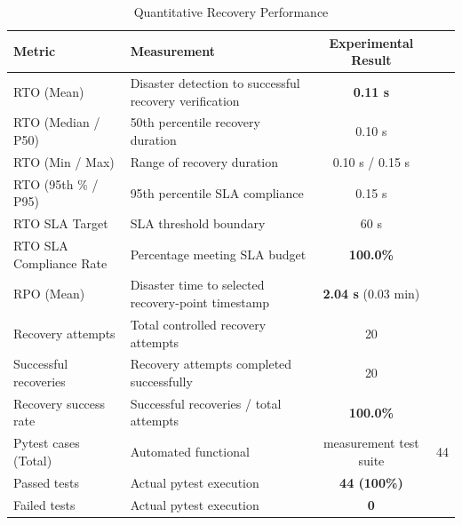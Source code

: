 \begin{table}[htbp]
\caption{Quantitative Recovery Performance}
\label{tab:quant_recovery}
\centering
\begin{tabular}{|l|p{4.2cm}|c|}
\hline
\textbf{Metric} & \textbf{Measurement} & \textbf{Experimental Result} \\
\hline
RTO (Mean) & Disaster detection to successful recovery verification & \textbf{0.11 s} \\
RTO (Median / P50) & 50th percentile recovery duration & 0.10 s \\
RTO (Min / Max) & Range of recovery duration & 0.10 s / 0.15 s \\
RTO (95th \% / P95) & 95th percentile SLA compliance & 0.15 s \\
RTO SLA Target & SLA threshold boundary & 60 s \\
RTO SLA Compliance Rate & Percentage meeting SLA budget & \textbf{100.0\%} \\
RPO (Mean) & Disaster time to selected recovery-point timestamp & \textbf{2.04 s} (0.03 min) \\
Recovery attempts & Total controlled recovery attempts & 20 \\
Successful recoveries & Recovery attempts completed successfully & 20 \\
Recovery success rate & Successful recoveries / total attempts & \textbf{100.0\%} \\
Pytest cases (Total) & Automated functional & measurement test suite & 44 \\
Passed tests & Actual pytest execution & \textbf{44 (100\%)} \\
Failed tests & Actual pytest execution & \textbf{0} \\
\hline
\end{tabular}
\end{table}

